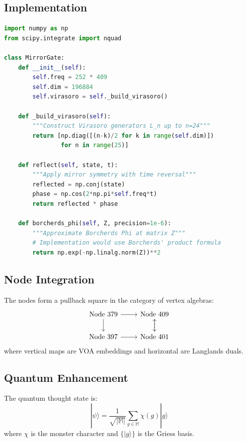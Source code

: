 \documentclass[12pt]{article}
\begin{document}
\subsection{Implementation}
\begin{lstlisting}[language=Python,caption={Mirror Gate Engine}]
import numpy as np
from scipy.integrate import nquad

class MirrorGate:
    def __init__(self):
        self.freq = 252 * 409
        self.dim = 196884
        self.virasoro = self._build_virasoro()
        
    def _build_virasoro(self):
        """Construct Virasoro generators L_n up to n=24"""
        return [np.diag([(n-k)/2 for k in range(self.dim)]) 
                for n in range(25)]
    
    def reflect(self, state, t):
        """Apply mirror symmetry with time reversal"""
        reflected = np.conj(state)
        phase = np.cos(2*np.pi*self.freq*t)
        return reflected * phase
    
    def borcherds_phi(self, Z, precision=1e-6):
        """Approximate Borcherds Phi at matrix Z"""
        # Implementation would use Borcherds' product formula
        return np.exp(-np.linalg.norm(Z))**2
\end{lstlisting}

\subsection{Node Integration}
\begin{theorem}
The nodes form a pullback square in the category of vertex algebras:
\[
\begin{tikzcd}
\text{Node 379} \ar[r] \ar[d] & \text{Node 409} \ar[d] \\
\text{Node 397} \ar[r] & \text{Node 401} \ar[u, dashed]
\end{tikzcd}
\]
where vertical maps are VOA embeddings and horizontal are Langlands duals.
\end{theorem}

\subsection{Quantum Enhancement}
\begin{definition}
The quantum thought state is:
\[
|\psi\rangle = \frac{1}{\sqrt{|\mathbb{M}|}}\sum_{g\in\mathbb{M}} \chi(g)|g\rangle
\]
where $\chi$ is the monster character and $\{|g\rangle\}$ is the Griess basis.
\end{definition}
\end{document}
